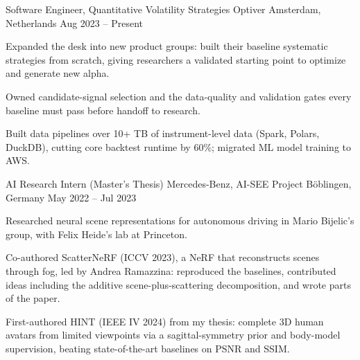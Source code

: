 
\begin{cventries}

  \cventry
    {Software Engineer, Quantitative Volatility Strategies} %
    {Optiver} %
    {Amsterdam, Netherlands} %
    {Aug 2023 -- Present} %
    {
      \begin{cvitems} %
        \item {Expanded the desk into new product groups: built their baseline systematic strategies from scratch, giving researchers a validated starting point to optimize and generate new alpha.}
        \item {Owned candidate-signal selection and the data-quality and validation gates every baseline must pass before handoff to research.}
        \item {Built data pipelines over 10+ TB of instrument-level data (Spark, Polars, DuckDB), cutting core backtest runtime by 60\%; migrated ML model training to AWS.}
      \end{cvitems}
    }

  \cventry
    {AI Research Intern (Master's Thesis)} %
    {Mercedes-Benz, AI-SEE Project} %
    {Böblingen, Germany} %
    {May 2022 -- Jul 2023} %
    {
      \begin{cvitems} %
        \item {Researched neural scene representations for autonomous driving in Mario Bijelic's group, with Felix Heide's lab at Princeton.}
        \item {Co-authored ScatterNeRF (ICCV 2023), a NeRF that reconstructs scenes through fog, led by Andrea Ramazzina: reproduced the baselines, contributed ideas including the additive scene-plus-scattering decomposition, and wrote parts of the paper.}
        \item {First-authored HINT (IEEE IV 2024) from my thesis: complete 3D human avatars from limited viewpoints via a sagittal-symmetry prior and body-model supervision, beating state-of-the-art baselines on PSNR and SSIM.}
      \end{cvitems}
    }

\end{cventries}
